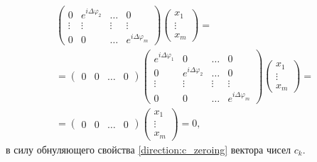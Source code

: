 \begin{multline*}
\begin{pmatrix}
        0                      & e^{i \Delta \varphi_2} & \dots  & 0                      \\
        \vdots                 & \vdots                 & \vdots & \vdots                 \\
        0                      & 0                      & \dots  & e^{i \Delta \varphi_m}
    \end{pmatrix}
    \begin{pmatrix}
        x_1    \\
        \vdots \\
        x_m
    \end{pmatrix} = \\
    = \begin{pmatrix}
        0 & 0 & \dots & 0
    \end{pmatrix}
    \begin{pmatrix}
        e^{i \Delta \varphi_1} & 0                      & \dots  & 0                      \\
        0                      & e^{i \Delta \varphi_2} & \dots  & 0                      \\
        \vdots                 & \vdots                 & \vdots & \vdots                 \\
        0                      & 0                      & \dots  & e^{i \Delta \varphi_m}
    \end{pmatrix}
    \begin{pmatrix}
        x_1    \\
        \vdots \\
        x_m
    \end{pmatrix} = \\
    = \begin{pmatrix}
        0 & 0 & \dots & 0
    \end{pmatrix}
    \begin{pmatrix}
        x_1    \\
        \vdots \\
        x_m
    \end{pmatrix}
    = 0 ,
\end{multline*}
в силу обнуляющего свойства \eqref{direction:c_zeroing} вектора чисел $c_k$.

